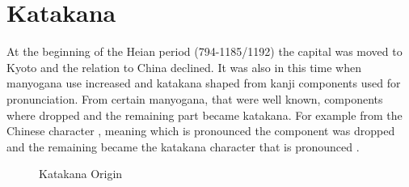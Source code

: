 
\section{Katakana}\label{sec:Katakana}


At the beginning of the Heian period (794-1185/1192) the capital was moved to
Kyoto and the relation to China declined. It was also in this time when
manyogana use increased and katakana shaped from kanji components used for
pronunciation. From certain manyogana, that were well known, components where
dropped and the remaining part became katakana. For example from the Chinese
character , meaning  which is
pronounced  the  component was dropped and the
remaining  became the katakana character that is pronounced .

\begin{figure}[H]
\begin{center}

\caption{Katakana Origin}
\label{fig:KatakanaOrigin} %
\end{center}
\end{figure}

